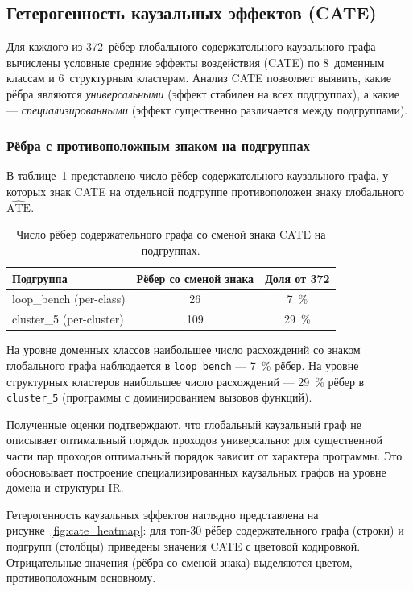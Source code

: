 \subsection{Гетерогенность каузальных эффектов (CATE)}

Для каждого из 372~рёбер глобального содержательного каузального графа вычислены условные средние эффекты воздействия (CATE) по 8~доменным классам и 6~структурным кластерам. Анализ CATE позволяет выявить, какие рёбра являются \emph{универсальными} (эффект стабилен на всех подгруппах), а какие --- \emph{специализированными} (эффект существенно различается между подгруппами).

\subsubsection{Рёбра с противоположным знаком на подгруппах}

В таблице~\ref{tab:sign_flips} представлено число рёбер содержательного каузального графа, у которых знак CATE на отдельной подгруппе противоположен знаку глобального~$\widehat{\text{ATE}}$.

\begin{table}[h]
\centering
\caption{Число рёбер содержательного графа со сменой знака CATE на подгруппах.}
\label{tab:sign_flips}
\begin{tabular}{lcc}
\hline
Подгруппа & Рёбер со сменой знака & Доля от 372 \\
\hline
loop\_bench (per-class)  & 26  & 7~\% \\
cluster\_5 (per-cluster) & 109 & 29~\% \\
\hline
\end{tabular}
\end{table}

На уровне доменных классов наибольшее число расхождений со знаком глобального графа наблюдается в \texttt{loop\_bench} --- 7~\% рёбер. На уровне структурных кластеров наибольшее число расхождений --- 29~\% рёбер в \texttt{cluster\_5} (программы с доминированием вызовов функций).

Полученные оценки подтверждают, что глобальный каузальный граф не описывает оптимальный порядок проходов универсально: для существенной части пар проходов оптимальный порядок зависит от характера программы. Это обосновывает построение специализированных каузальных графов на уровне домена и структуры IR.

Гетерогенность каузальных эффектов наглядно представлена на рисунке~\ref{fig:cate_heatmap}: для топ-30 рёбер содержательного графа (строки) и подгрупп (столбцы) приведены значения CATE с цветовой кодировкой. Отрицательные значения (рёбра со сменой знака) выделяются цветом, противоположным основному.

